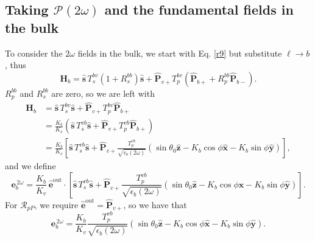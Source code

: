 \subsection{Taking \texorpdfstring{$\mathcal{P}(2\omega)$}{P(2w)} and the
fundamental fields in the bulk}

To consider the $2\omega$ fields in the bulk, we start with Eq. \eqref{r9} but
substitute $\ell\rightarrow b$, thus
\begin{equation*}
\mathbf{H}_{b}
= \hat{\mathbf{s}}\,T_s^{b v}\left(1+R_{s}^{b b}\right)\hat{\mathbf{s}}
+ \hat{\mathbf{P}}_{v+}T_{p}^{b v}
\left(
\hat{\mathbf{P}}_{b+} + R_{p}^{b b}\hat{\mathbf{P}}_{b-}
\right).
\end{equation*}
$R_{p}^{b b}$ and $R_{s}^{b b}$ are zero, so we are left with
\begin{equation*}
\begin{split}
\mathbf{H}_{b}
&= \hat{\mathbf{s}}\,T_s^{b v}\hat{\mathbf{s}}
 + \hat{\mathbf{P}}_{v+}T_{p}^{b v}\hat{\mathbf{P}}_{b+}\\
&= \frac{K_{b}}{K_{v}}\left(\hat{\mathbf{s}}\,T_s^{vb}\hat{\mathbf{s}}
 + \hat{\mathbf{P}}_{v+}T_{p}^{vb}\hat{\mathbf{P}}_{b+}\right)\\
&= \frac{K_{b}}{K_{v}}
   \left[
   \hat{\mathbf{s}}\,T_s^{vb}\hat{\mathbf{s}}
 + \hat{\mathbf{P}}_{v+}
   \frac{T_{p}^{vb}}{\sqrt{\epsilon_{b}(2\omega)}}
   (\sin\theta_{0}\hat{\mathbf{z}}
 - K_{b}\cos\phi\hat{\mathbf{x}} 
 - K_{b}\sin\phi\hat{\mathbf{y}})
   \right],
\end{split}
\end{equation*}
and we define
\begin{equation*}
\mathbf{e}^{\,2\omega}_{b}
= \frac{K_{b}}{K_{v}}\,\hat{\mathbf{e}}^{\mathrm{out}}\cdot
\left[
   \hat{\mathbf{s}}\,T_s^{vb}\hat{\mathbf{s}}
 + \hat{\mathbf{P}}_{v+}
   \frac{T_{p}^{vb}}{\sqrt{\epsilon_{b}(2\omega)}}
   (\sin\theta_{0}\hat{\mathbf{z}}
 - K_{b}\cos\phi\hat{\mathbf{x}} 
 - K_{b}\sin\phi\hat{\mathbf{y}})
   \right].
\end{equation*}
For $\mathcal{R}_{pP}$, we require
$\hat{\mathbf{e}}^{\mathrm{out}}=\hat{\mathbf{P}}_{v+}$, so we have that
\begin{equation*}
\mathbf{e}^{\,2\omega}_{b}
= \frac{K_{b}}{K_{v}}
  \frac{T_{p}^{vb}}{\sqrt{\epsilon_{b}(2\omega)}}
  (\sin\theta_{0}\hat{\mathbf{z}}
- K_{b}\cos\phi\hat{\mathbf{x}} 
- K_{b}\sin\phi\hat{\mathbf{y}}).
\end{equation*}

